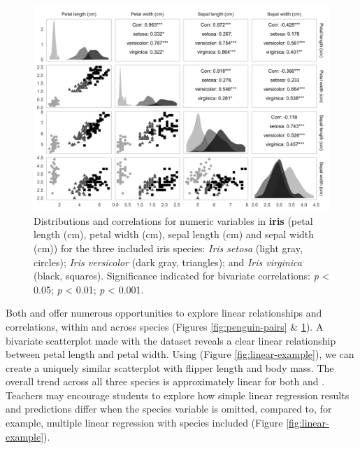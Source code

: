\begin{Schunk}
\begin{figure}

{\centering \includegraphics[width=\textwidth]{figs/iris-pairs-1} 

}

\caption{Distributions and correlations for numeric variables in \textbf{iris} (petal length (cm), petal width (cm), sepal length (cm) and sepal width (cm)) for the three included iris species: \textit{Iris setosa} (light gray, circles); \textit{Iris versicolor} (dark gray, triangles); and \textit{Iris virginica} (black, squares). Significance indicated for bivariate correlations: \text{*}\textit{p} < 0.05; \text{*}\text{*}\textit{p} < 0.01; \text{*}\text{*}\text{*}\textit{p} < 0.001.}\label{fig:iris-pairs}
\end{figure}
\end{Schunk}

Both  and  offer numerous opportunities to
explore linear relationships and correlations, within and across species
(Figures \ref{fig:penguin-pairs} \& \ref{fig:iris-pairs}). A bivariate
scatterplot made with the  dataset reveals a clear linear
relationship between petal length and petal width. Using 
(Figure \ref{fig:linear-example}), we can create a uniquely similar
scatterplot with flipper length and body mass. The overall trend across
all three species is approximately linear for both  and
. Teachers may encourage students to explore how simple
linear regression results and predictions differ when the species
variable is omitted, compared to, for example, multiple linear
regression with species included (Figure \ref{fig:linear-example}).


